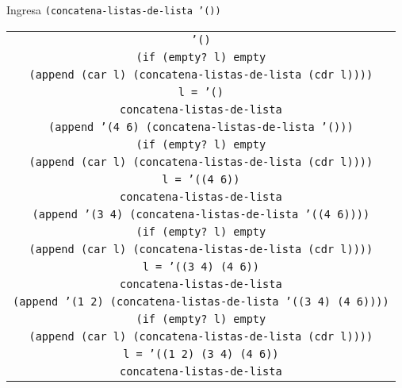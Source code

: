 \documentclass[letterpaper,11pt]{article}
\begin{document}
\begin{enumerate}
\begin{enumerate}
        \newpage
        Ingresa \texttt{(concatena-listas-de-lista '())}
        \begin{center}
            \begin{tabular}{|c|}
                \hline
                \texttt{'()}  \\
                \texttt{(if (empty? l) empty} \\
                \texttt{(append (car l) (concatena-listas-de-lista (cdr l))))} \\
                \texttt{l = '()} \\
                \texttt{concatena-listas-de-lista} \\
                \hline
                \hline
                \texttt{(append '(4 6) (concatena-listas-de-lista '()))} \\
                \texttt{(if (empty? l) empty} \\
                \texttt{(append (car l) (concatena-listas-de-lista (cdr l))))} \\
                \texttt{l = '((4 6))} \\
                \texttt{concatena-listas-de-lista} \\
                \hline
                \hline
                \texttt{(append '(3 4) 
                (concatena-listas-de-lista '((4 6))))}  \\
                \texttt{(if (empty? l) empty} \\
                \texttt{(append (car l) (concatena-listas-de-lista (cdr l))))} \\
                \texttt{l = '((3 4) (4 6))} \\
                \texttt{concatena-listas-de-lista} \\
                \hline
                \hline
                \texttt{(append '(1 2) 
                (concatena-listas-de-lista '((3 4) (4 6))))}  \\
                \texttt{(if (empty? l) empty} \\
                \texttt{(append (car l) (concatena-listas-de-lista (cdr l))))} \\
                \texttt{l = '((1 2) (3 4) (4 6))} \\
                \texttt{concatena-listas-de-lista} \\
                \hline
            \end{tabular}
        \end{center}


\end{enumerate}
\end{enumerate}
\end{document}
